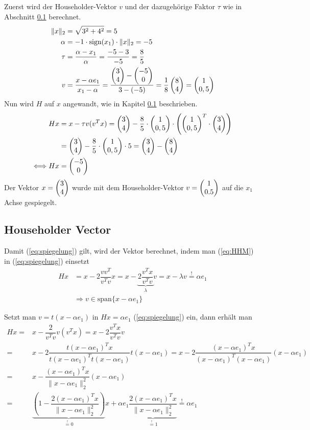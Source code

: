 Zuerst wird der Householder-Vektor $v$ und der dazugehörige Faktor $\tau$ wie in Abschnitt \ref{sec:HHvec} berechnet.
\begin{align*}
	\|x\|_2 &= \sqrt{3^2 + 4^2} = 5\\
	\alpha &= -1 \cdot \text{sign}(x_1) \cdot \|x\|_2 = -5 \\
	\tau &= \dfrac{\alpha - x_1}{\alpha} = \dfrac{-5 - 3}{-5} = \dfrac{8}{5} \\
	v &=\dfrac{x - \alpha e_1}{x_1 - \alpha} = \dfrac{\begin{pmatrix} 3\\4 \end{pmatrix} - \begin{pmatrix} -5\\0 \end{pmatrix}}{3- (-5)} = \dfrac{1}{8} \begin{pmatrix} 8\\4 \end{pmatrix} = \begin{pmatrix} 1\\0,5 \end{pmatrix}
\end{align*}
Nun wird $H$ auf $x$ angewandt, wie in Kapitel \ref{sec:HHvec} beschrieben.
\begin{align*}
	Hx &= x - \tau v (v^T x) = \begin{pmatrix} 3\\4 \end{pmatrix} - \dfrac{8}{5} \cdot \begin{pmatrix} 1\\0,5 \end{pmatrix} \cdot \left(  \begin{pmatrix} 1\\0,5 \end{pmatrix}^T \cdot \begin{pmatrix} 3\\4 \end{pmatrix} \right)\\
	&= \begin{pmatrix} 3\\4 \end{pmatrix} - \dfrac{8}{5} \cdot \begin{pmatrix} 1\\0,5 \end{pmatrix} \cdot 5 = \begin{pmatrix} 3\\4 \end{pmatrix} - \begin{pmatrix} 8\\4 \end{pmatrix} \\
	\Longleftrightarrow Hx&= \begin{pmatrix} -5\\0 \end{pmatrix}
\end{align*}
Der Vektor $x = \begin{pmatrix} 3\\4 \end{pmatrix}$ wurde mit dem Householder-Vektor $v= \begin{pmatrix} 1\\0.5 \end{pmatrix}$ auf die $x_1$ Achse gespiegelt.

\subsection{Householder Vector} \label{sec:HHvec}
Damit (\ref{eq:spiegelung}) gilt, wird der Vektor berechnet, 
indem man (\ref{eq:HHM}) in (\ref{eq:spiegelung}) einsetzt
\begin{align*}
Hx &= x - 2\dfrac{vv^T}{v^Tv} x = x - \underbrace{2\dfrac{v^Tx}{v^Tv}}_{\lambda} v = x - \lambda v \overset{!}{=} \alpha e_1 \\
&\Longrightarrow v \in \text{span}\{x - \alpha e_1\}
\end{align*}

Setzt man $v = t(x - \alpha e_1)$ in $Hx = \alpha e_1 $ (\ref{eq:spiegelung}) ein, dann erhält man 
\begin{align}
Hx =& x - \dfrac{2}{v^Tv}v(v^Tx) = x - 2\dfrac{v^Tx}{v^Tv}v \nonumber \\
=& x - 2\dfrac{ t(x - \alpha e_1)^Tx}{ t(x - \alpha e_1)^T t(x - \alpha e_1)} t(x - \alpha e_1)
= x - 2\dfrac{ (x - \alpha e_1)^Tx}{ (x - \alpha e_1)^T (x - \alpha e_1)} (x - \alpha e_1)
\nonumber \\
=& x - \dfrac{(x - \alpha e_1)^Tx}{\|x - \alpha e_1\|_2^2} (x - \alpha e_1) \nonumber \\
=&\underbrace{\left(1 - \dfrac{2(x - \alpha e_1)^Tx}{\|x - \alpha e_1\|_2^2}\right)}_{ \overset{!}{=} 0 } x + \alpha e_1 \underbrace{\dfrac{2(x - \alpha e_1)^Tx}{\|x - \alpha e_1\|_2^2} }_{\overset{!}{=} 1} \overset{!}{=} \alpha e_1 \label{lasteq}
\end{align}

